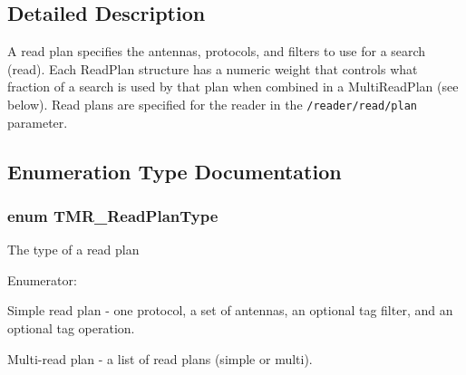 \subsection{Detailed Description}
A read plan specifies the antennas, protocols, and filters to use for a search (read). Each ReadPlan structure has a numeric weight that controls what fraction of a search is used by that plan when combined in a MultiReadPlan (see below). Read plans are specified for the reader in the {\tt /reader/read/plan} parameter. 

\subsection{Enumeration Type Documentation}
\hypertarget{group__readplan_g4646d0bb9359362ac44e57f04f7e429c}{
\subsubsection[{TMR\_\-ReadPlanType}]{\setlength{\rightskip}{0pt plus 5cm}enum {\bf TMR\_\-ReadPlanType}}}
\label{group__readplan_g4646d0bb9359362ac44e57f04f7e429c}


The type of a read plan \begin{Desc}
\item[Enumerator: ]\par
\begin{description}
\item[{\em 
\hypertarget{group__readplan_gg4646d0bb9359362ac44e57f04f7e429ce19fe5cee99f0bd3a3ae118dced8e426}{
TMR\_\-READ\_\-PLAN\_\-TYPE\_\-SIMPLE}
\label{group__readplan_gg4646d0bb9359362ac44e57f04f7e429ce19fe5cee99f0bd3a3ae118dced8e426}
}]Simple read plan - one protocol, a set of antennas, an optional tag filter, and an optional tag operation. \item[{\em 
\hypertarget{group__readplan_gg4646d0bb9359362ac44e57f04f7e429c886bea5e75d6b2f7d11574666450ab77}{
TMR\_\-READ\_\-PLAN\_\-TYPE\_\-MULTI}
\label{group__readplan_gg4646d0bb9359362ac44e57f04f7e429c886bea5e75d6b2f7d11574666450ab77}
}]Multi-read plan - a list of read plans (simple or multi). \end{description}
\end{Desc}



